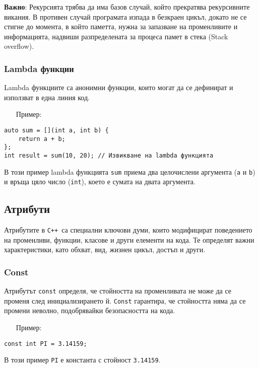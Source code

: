\documentclass[oneside]{book}
\newcommand*{\code}[1]{\texttt{#1}}
\newcommand*{\cpp}{\texttt{C++}\ }
\begin{document}
\textbf{Важно}: Рекурсията трябва да има базов случай, който прекратява рекурсивните викания. В противен случай програмата изпада в безкраен цикъл, докато не се стигне до момента, в който паметта, нужна за запазване на променливите и информацията, надвиши разпределената за процеса памет в стека (Stack overflow).

\subsubsection{Lambda функции}
Lambda функциите са анонимни функции, които могат да се дефинират и използват в една линия код.

\begin{itemize}\item[Пример:]\end{itemize} 
\begin{mdframed}\begin{lstlisting}
auto sum = [](int a, int b) {
    return a + b;
};
int result = sum(10, 20); // Извикване на lambda функцията
\end{lstlisting}\end{mdframed}
В този пример lambda функцията \code{sum} приема два целочислени аргумента (\code{a} и \code{b}) и връща цяло число (\code{int}), което е сумата на двата аргумента.

\subsection{Атрибути}
Атрибутите в \cpp са специални ключови думи, които модифицират поведението на променливи, функции, класове и други елементи на кода. Те определят важни характеристики, като обхват, вид, жизнен цикъл, достъп и други.

\subsubsection{Const}
Атрибутът \code{const} определя, че стойността на променливата не може да се променя след инициализирането й. \code{Const} гарантира, че стойността няма да се промени неволно, подобрявайки безопасността на кода.

\begin{itemize}\item[Пример:]\end{itemize} 
\begin{mdframed}\begin{lstlisting}
const int PI = 3.14159;
\end{lstlisting}\end{mdframed}
В този пример \code{PI} е константа с стойност \code{3.14159}.
\end{document}
